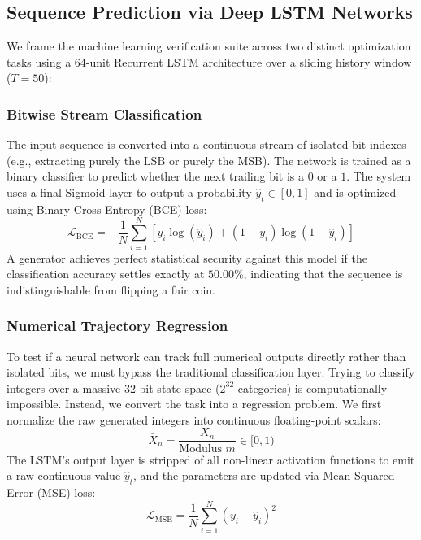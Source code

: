 \documentclass[twocolumn,10pt]{article}
\begin{document}
\subsection{Sequence Prediction via Deep LSTM Networks}
We frame the machine learning verification suite across two distinct optimization tasks using a 64-unit Recurrent LSTM architecture over a sliding history window ($T=50$):

\subsubsection{Bitwise Stream Classification}
The input sequence is converted into a continuous stream of isolated bit indexes (e.g., extracting purely the LSB or purely the MSB). The network is trained as a binary classifier to predict whether the next trailing bit is a $0$ or a $1$. The system uses a final Sigmoid layer to output a probability $\hat{y}_t \in [0, 1]$ and is optimized using Binary Cross-Entropy (BCE) loss:
\begin{equation}
\mathcal{L}_{\text{BCE}} = -\frac{1}{N}\sum_{i=1}^N \left[ y_i \log(\hat{y}_i) + (1-y_i)\log(1-\hat{y}_i) \right]
\end{equation}
A generator achieves perfect statistical security against this model if the classification accuracy settles exactly at $50.00\%$, indicating that the sequence is indistinguishable from flipping a fair coin.

\subsubsection{Numerical Trajectory Regression}
To test if a neural network can track full numerical outputs directly rather than isolated bits, we must bypass the traditional classification layer. Trying to classify integers over a massive 32-bit state space ($2^{32}$ categories) is computationally impossible. Instead, we convert the task into a regression problem. We first normalize the raw generated integers into continuous floating-point scalars:
\begin{equation}
\bar{X}_n = \frac{X_n}{\text{Modulus } m} \in [0, 1)
\end{equation}
The LSTM's output layer is stripped of all non-linear activation functions to emit a raw continuous value $\hat{y}_t$, and the parameters are updated via Mean Squared Error (MSE) loss:
\begin{equation}\label{eq:mse_loss}
\mathcal{L}_{\text{MSE}} = \frac{1}{N}\sum_{i=1}^N (y_i - \hat{y}_i)^2
\end{equation}
\end{document}
